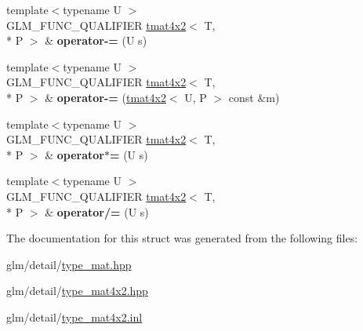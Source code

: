 \begin{DoxyCompactItemize}
\item 
\hypertarget{structglm_1_1tmat4x2_ae2ad696a80928bd3ba571e8e65b196fb}{{\footnotesize template$<$typename U $>$ }\\G\-L\-M\-\_\-\-F\-U\-N\-C\-\_\-\-Q\-U\-A\-L\-I\-F\-I\-E\-R \hyperlink{structglm_1_1tmat4x2}{tmat4x2}$<$ T, \\*
P $>$ \& {\bfseries operator-\/=} (U s)}\label{structglm_1_1tmat4x2_ae2ad696a80928bd3ba571e8e65b196fb}

\item 
\hypertarget{structglm_1_1tmat4x2_a543c1cb13551ba460439f6546e813c4c}{{\footnotesize template$<$typename U $>$ }\\G\-L\-M\-\_\-\-F\-U\-N\-C\-\_\-\-Q\-U\-A\-L\-I\-F\-I\-E\-R \hyperlink{structglm_1_1tmat4x2}{tmat4x2}$<$ T, \\*
P $>$ \& {\bfseries operator-\/=} (\hyperlink{structglm_1_1tmat4x2}{tmat4x2}$<$ U, P $>$ const \&m)}\label{structglm_1_1tmat4x2_a543c1cb13551ba460439f6546e813c4c}

\item 
\hypertarget{structglm_1_1tmat4x2_abff57703eba125c97a625c94924d8e52}{{\footnotesize template$<$typename U $>$ }\\G\-L\-M\-\_\-\-F\-U\-N\-C\-\_\-\-Q\-U\-A\-L\-I\-F\-I\-E\-R \hyperlink{structglm_1_1tmat4x2}{tmat4x2}$<$ T, \\*
P $>$ \& {\bfseries operator$\ast$=} (U s)}\label{structglm_1_1tmat4x2_abff57703eba125c97a625c94924d8e52}

\item 
\hypertarget{structglm_1_1tmat4x2_a7ad8f4359e6257d46c597bc345d90205}{{\footnotesize template$<$typename U $>$ }\\G\-L\-M\-\_\-\-F\-U\-N\-C\-\_\-\-Q\-U\-A\-L\-I\-F\-I\-E\-R \hyperlink{structglm_1_1tmat4x2}{tmat4x2}$<$ T, \\*
P $>$ \& {\bfseries operator/=} (U s)}\label{structglm_1_1tmat4x2_a7ad8f4359e6257d46c597bc345d90205}

\end{DoxyCompactItemize}


The documentation for this struct was generated from the following files\-:\begin{DoxyCompactItemize}
\item 
glm/detail/\hyperlink{type__mat_8hpp}{type\-\_\-mat.\-hpp}\item 
glm/detail/\hyperlink{type__mat4x2_8hpp}{type\-\_\-mat4x2.\-hpp}\item 
glm/detail/\hyperlink{type__mat4x2_8inl}{type\-\_\-mat4x2.\-inl}\end{DoxyCompactItemize}
